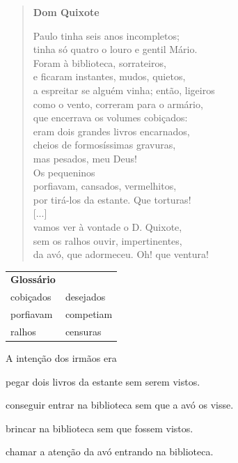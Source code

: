 \begin{myquote}
\begin{verse}
\textbf{Dom Quixote}

Paulo tinha seis anos incompletos;\\
tinha só quatro o louro e gentil Mário.\\
Foram à biblioteca, sorrateiros,\\
e ficaram instantes, mudos, quietos,\\
a espreitar se alguém vinha; então, ligeiros\\
como o vento, correram para o armário,\\
que encerrava os volumes cobiçados:\\
eram dois grandes livros encarnados,\\
cheios de formosíssimas gravuras,\\
mas pesados, meu Deus!\\
Os pequeninos\\
porfiavam, cansados, vermelhitos,\\
por tirá-los da estante. Que torturas!\\
{[}...{]}\\
vamos ver à vontade o D. Quixote,\\
sem os ralhos ouvir, impertinentes,\\
da avó, que adormeceu. Oh! que ventura!
\end{verse}

\end{myquote}

\begin{tabular}{ll}
\textbf{Glossário} & \mbox{}\\
cobiçados & desejados\\
porfiavam & competiam\\
ralhos & censuras\\
\end{tabular}

A intenção dos irmãos era

\begin{escolha}
\item pegar dois livros da estante sem serem vistos.

\item conseguir entrar na biblioteca sem que a avó os visse.

\item brincar na biblioteca sem que fossem vistos.

\item chamar a atenção da avó entrando na biblioteca.
\end{escolha}

